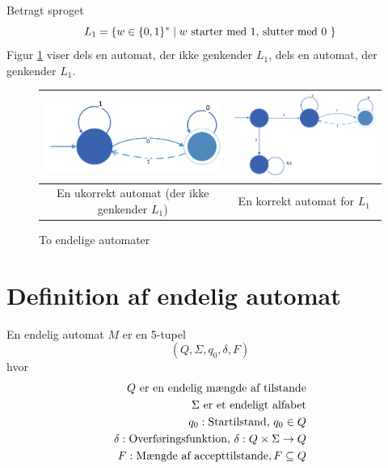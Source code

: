\documentclass[a4paper,10pt,article]{memoir}
\begin{document}
\begin{eksempel}
Betragt sproget
%
\[ L_1 = \{ w \in \{ 0,1 \}^* \mid  w \text{ starter med 1, slutter
    med 0 } \} \]
%
Figur \ref{fig:m2} viser dels en automat, der ikke genkender $L_1$, dels en automat, der genkender $L_1$.
\begin{figure}
\begin{center}
  \begin{tabular}{| c| c |}
    \hline
    \includegraphics[width=60mm]{fig2.PNG} & \includegraphics[width=60mm]{fig3.PNG} \\ \hline
     En ukorrekt automat (der ikke genkender $L_1$) & En korrekt
     automat for $L_1$ \\ 
    \hline
  \end{tabular}
\end{center}
\caption{To endelige automater}
\label{fig:m2}
\end{figure}

\end{eksempel}

  \section{Definition af endelig automat}
  
\begin{definition}
En endelig automat $M$ er en 5-tupel
%
\[ (Q,\Sigma,q_0,\delta,F)  \]
%
hvor
\begin{align*}
Q \text{ er en endelig mængde af tilstande} \\
\Sigma \text{ er et endeligt alfabet} \\
q_0: \text{Startilstand, } q_0 \in Q \\
\delta: \text{Overføringsfunktion, } \delta:  Q \times \Sigma \rightarrow Q \\
F: \text{Mængde af accepttilstande}, F \subseteq Q
\end{align*}
\end{definition}
\end{document}
